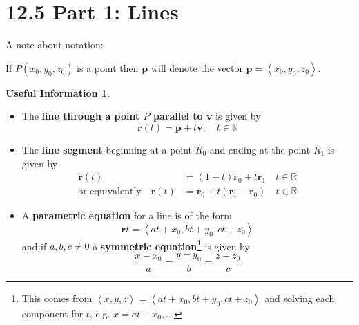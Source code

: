 \documentclass[12pt]{exam}
\newcommand{\R}{\mathbb{R}}
\newcommand{\br}{\bm{r}}
\newcommand{\bv}{\bm{v}}
\newcommand{\gen}[1]{\left\langle #1 \right\rangle}
\theoremstyle{definition}
\newtheorem*{info}{Useful Information}
\theoremstyle{remark}
\begin{document}
\section*{12.5 Part 1: Lines}

A note about notation:
\begin{center}
If \(P(x_0,y_0,z_0)\) is a point then \(\bm{p}\) will denote the vector 
    \(
        \bm{p}=\gen{x_0,y_0,z_0}.
    \)
    \end{center}
\begin{info}
\phantom{.}
    \begin{itemize}
            \item The \textbf{line through a point \(P\) parallel to \(\bv\)} is given by
            \begin{equation}
                \br(t)=\bm{p}+t\bv,\quad t\in \R \label{eqn:point_vector}
            \end{equation}
            \item The \textbf{line segment} beginning at a point \(R_0\) and ending at the point \(R_1\) is given by
            \begin{align}
                \br(t) & = (1-t)\br_0+t\br_1\quad t\in\R\\
                \text{or equivalently}\quad \br(t) & =\br_0+t(\br_1-\br_0)\quad t\in \R\label{eqn:twopoints_alt}
            \end{align}
            \item A \textbf{parametric equation} for a line is of the form
            \[
                \br{t}=\gen{at+x_0,bt+y_0,ct+z_0}
            \]
            and if \(a,b,c\ne 0\) a \textbf{symmetric equation\footnote[1]{
            This comes from $\gen{x,y,z}=\gen{at+x_0,bt+y_0,ct+z_0}$ and solving each component for \(t\), e.g. $x=at+x_0,\ldots$}
            } is given by 
            \[
                \dfrac{x-x_0}{a}=\dfrac{y-y_0}{b}=\dfrac{z-z_0}{c}
            \]

    \end{itemize}
        
\end{info}
\end{document}
